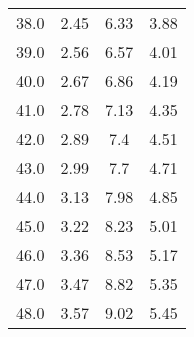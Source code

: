 \begin{table}
\begin{tabular}{cccc}
38.0 & 2.45 & 6.33 & 3.88 \\
39.0 & 2.56 & 6.57 & 4.01 \\
40.0 & 2.67 & 6.86 & 4.19 \\
41.0 & 2.78 & 7.13 & 4.35 \\
42.0 & 2.89 & 7.4 & 4.51 \\
43.0 & 2.99 & 7.7 & 4.71 \\
44.0 & 3.13 & 7.98 & 4.85 \\
45.0 & 3.22 & 8.23 & 5.01 \\
46.0 & 3.36 & 8.53 & 5.17 \\
47.0 & 3.47 & 8.82 & 5.35 \\
48.0 & 3.57 & 9.02 & 5.45 \\
\end{tabular}
\end{table}
